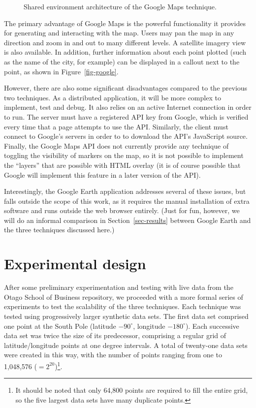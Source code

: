 \documentclass[acmtocl,acmnow]{acmtrans2m}
\begin{document}
\begin{figure}
	\caption{Shared environment architecture of the Google Maps
	technique.}
	\label{fig-google-architecture}
\end{figure}


The primary advantage of Google Maps is the powerful functionality it
provides for generating and interacting with the map. Users may pan the
map in any direction and zoom in and out to many different levels. A
satellite imagery view is also available. In addition, further
information about each point plotted (such as the name of the city, for
example) can be displayed in a callout next to the point, as shown in
Figure~\ref{fig-google}.

However, there are also some significant disadvantages compared to the
previous two techniques. As a distributed application, it will be more
complex to implement, test and debug. It also relies on an active
Internet connection in order to run. The server must have a registered
API key from Google, which is verified every time that a page attempts
to use the API. Similarly, the client must connect to Google's servers
in order to to download the API's JavaScript source. Finally, the Google
Maps API does not currently provide any technique of toggling the
visibility of markers on the map, so it is not possible to implement the
``layers'' that are possible with HTML overlay (it is of course possible
that Google will implement this feature in a later version of the API).

Interestingly, the Google Earth application addresses several of these
issues, but falls outside the scope of this work, as it requires the
manual installation of extra software and runs outside the web browser
entirely. (Just for fun, however, we will do an informal comparison in
Section~\ref{sec-results} between Google Earth and the three techniques
discussed here.)


\section{Experimental design}
\label{sec-experiment}

After some preliminary experimentation and testing with live data from
the Otago School of Business repository, we proceeded with a more formal
series of experiments to test the scalability of the three techniques.
Each technique was tested using progressively larger synthetic data
sets. The first data set comprised one point at the South Pole (latitude
\(-90^{\circ}\), longitude \(-180^{\circ}\)). Each successive data set
was twice the size of its predecessor, comprising a regular grid of
latitude/longitude points at one degree intervals. A total of twenty-one
data sets were created in this way, with the number of points ranging
from one to 1,048,576 (\(=2^{20}\))\footnote{It should be noted that
only 64,800 points are required to fill the entire grid, so the five
largest data sets have many duplicate points.}.
\end{document}
